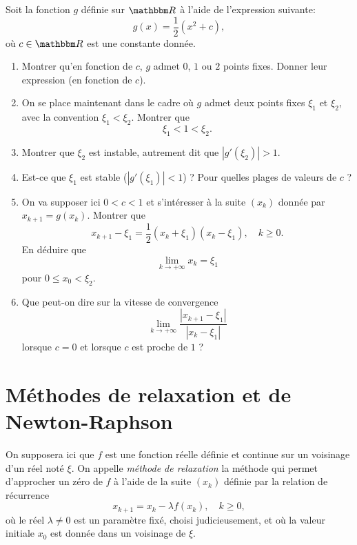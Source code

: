 \begin{exercice}

Soit la fonction $g$ définie sur $\eR$ à l'aide de l'expression suivante:
\[
g(x) = \frac12 ( x^2 + c ),
\]
où $c\in\eR$ est une constante donnée.

\begin{enumerate}

\item Montrer qu'en fonction de $c$, $g$ admet $0$, $1$ ou $2$ points fixes. Donner leur expression (en fonction de $c$).

\item On se place maintenant dans le cadre où $g$ admet deux points fixes $\xi_1$ et $\xi_2$, avec la convention $\xi_1 < \xi_2$. Montrer que 
\[
\xi_1 < 1 < \xi_2.
\]

\item Montrer que $\xi_2$ est instable, autrement dit que $|g'(\xi_2)| > 1$.

\item Est-ce que $\xi_1$ est stable ($|g'(\xi_1)| < 1$) ? Pour quelles plages de valeurs de $c$ ?

\item On va supposer ici $0 < c < 1$ et s'intéresser à la suite $(x_k)$ donnée par $x_{k+1} = g(x_k)$. Montrer que 
\[
x_{k+1} - \xi_1 = \frac12 ( x_k + \xi_1 ) ( x_k - \xi_1 ), \quad k\geq 0.
\]
En déduire que
\[
\lim_{k \rightarrow +\infty} x_k = \xi_1
\]
pour $0 \leq x_0 < \xi_2$.

\item Que peut-on dire sur la vitesse de convergence 
\[
\lim_{k\rightarrow +\infty} \frac{|x_{k+1} - \xi_1|}{| x_k - \xi_1 |}
\]
lorsque $c=0$ et lorsque $c$ est proche de $1$ ?

\end{enumerate}

\end{exercice}

\newpage

\section{Méthodes de relaxation et de Newton-Raphson}

On supposera ici que $f$ est une fonction réelle définie et continue sur un voisinage d'un réel noté $\xi$. On appelle \emph{méthode de relaxation} la méthode qui permet d'approcher un zéro de $f$ à l'aide de la suite $(x_k)$ définie par la relation de récurrence
\begin{equation} \label{eq:relaxation}
x_{k+1} = x_k - \lambda f(x_k), \quad k\geq0,
\end{equation}
où le réel $\lambda\neq0$ est un paramètre fixé, choisi judicieusement, et où la valeur initiale $x_0$ est donnée dans un voisinage de $\xi$.

